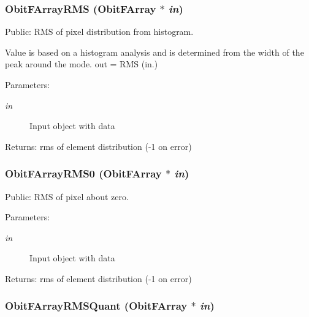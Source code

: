 \subsubsection{ Obit\-FArray\-RMS ({\bf Obit\-FArray} $\ast$ {\em in})}\label{ObitFArray_8c_a28}


Public: RMS of pixel distribution from histogram. 

Value is based on a histogram analysis and is determined from the width of the peak around the mode. out = RMS (in.) \begin{Desc}
\item[Parameters:]
\begin{description}
\item[{\em in}]Input object with data \end{description}
\end{Desc}
\begin{Desc}
\item[Returns:]rms of element distribution (-1 on error) \end{Desc}
\subsubsection{ Obit\-FArray\-RMS0 ({\bf Obit\-FArray} $\ast$ {\em in})}\label{ObitFArray_8c_a30}


Public: RMS of pixel about zero. 

\begin{Desc}
\item[Parameters:]
\begin{description}
\item[{\em in}]Input object with data \end{description}
\end{Desc}
\begin{Desc}
\item[Returns:]rms of element distribution (-1 on error) \end{Desc}
\subsubsection{ Obit\-FArray\-RMSQuant ({\bf Obit\-FArray} $\ast$ {\em in})}\label{ObitFArray_8c_a31}


